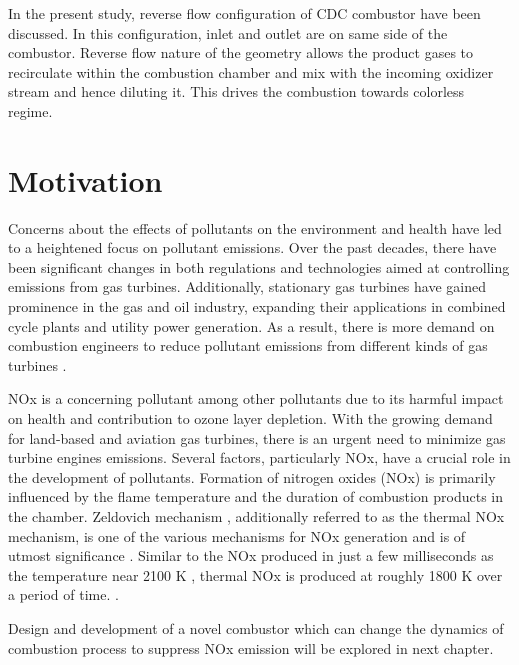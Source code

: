 In the present study, reverse flow configuration of CDC combustor have been discussed. In this configuration, inlet and outlet are on same side of the combustor. Reverse flow nature of the geometry allows the product gases to recirculate within the combustion chamber and mix with the incoming oxidizer stream and hence diluting it. This drives the combustion towards colorless regime.

\section{Motivation}
Concerns about the effects of pollutants on the environment and health have led to a heightened focus on pollutant emissions. Over the past decades, there have been significant changes in both regulations and technologies aimed at controlling emissions from gas turbines. Additionally, stationary gas turbines have gained prominence in the gas and oil industry, expanding their applications in combined cycle plants and utility power generation. As a result, there is more demand on combustion engineers to reduce pollutant emissions from different kinds of gas turbines \cite{LTY2013}.

NOx is a concerning pollutant among other pollutants due to its harmful impact on health and contribution to ozone layer depletion. With the growing demand for land-based and aviation gas turbines, there is an urgent need to minimize gas turbine engines emissions. Several factors, particularly NOx, have a crucial role in the development of pollutants. Formation of nitrogen oxides (NOx) is primarily influenced by the flame temperature and the duration of combustion products in the chamber. Zeldovich mechanism \cite{LTY2013}, additionally referred to as the thermal NOx mechanism, is one of the various mechanisms for NOx generation and is of utmost significance \cite{LAH2010}. Similar to the NOx produced in just a few milliseconds as the temperature near 2100 K \cite{LTY2013}, thermal NOx is produced at roughly 1800 K over a period of time. .

Design and development of a novel combustor which can change the dynamics of combustion process to suppress NOx emission will be explored in next chapter.

